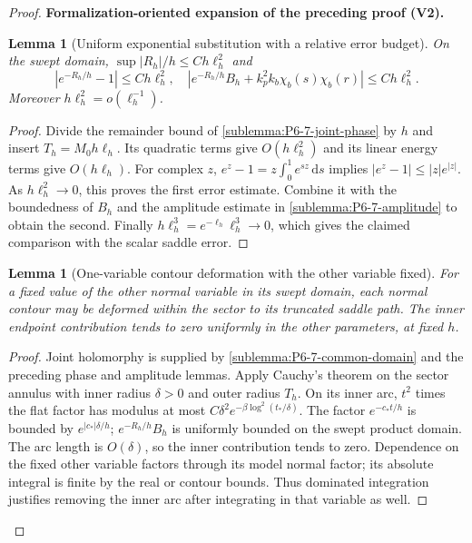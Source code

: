 \documentclass[11pt]{article}
\newtheorem{lemma}[theorem]{Lemma}
\newcommand{\formalisationparentid}{X}
\newenvironment{formalisationaddition}[1]{\par\medskip\begingroup\color{blue}\def\formalisationparentid{#1}\setcounter{formalizationsublemma}{0}\let\lemma\formalizationsublemma\let\endlemma\endformalizationsublemma
  \def\Eo{\mathcal E_h^\circ}\def\EE{\mathcal E_h}\def\phio{\phi_h^\circ}\def\phih{\phi_h}\def\Ho{H_h^{\rm atom}(v^\circ)}\def\Ha{H_h^{\rm atom}}\def\HL{H_h^{L}}\def\Dh{D_h}\def\Log{\operatorname{Log}}\def\ellh{\ell_h}\def\Gp{G_{p,h}}\def\Ast{A_{*,h}}\def\ahat{\widehat{\mathfrak a}_h}\def\ah{\mathfrak a_h}\def\rh{\widehat\rho_h}\def\deltah{\widehat\delta_h}\def\oldref##1{\textup{(##1)}}\def\interface##1{\par\noindent\textit{Analytical interface used here.} ##1\par}\def\finish{\par\noindent\textit{Conclusion of the formalization-oriented expansion.} }\par\noindent\textbf{Formalization-oriented expansion of the preceding proof (V2).}\par\smallskip
}{\par\endgroup\medskip
}
\begin{document}
\begin{proof}
\begin{formalisationaddition}{P6.7}
\begin{lemma}[Uniform exponential substitution with a relative error budget]\label{sublemma:P6-7-exponential-budget}
On the swept domain,
$\sup|R_h|/h\le Ch\ell_h^2$ and
\[
 |e^{-R_h/h}-1|\le Ch\ell_h^2,
 \quad
 |e^{-R_h/h}B_h+k_p^2k_b\chi_b(s)\chi_b(r)|\le Ch\ell_h^2.
\]
Moreover $h\ell_h^2=o(\ell_h^{-1})$.
\end{lemma}
\begin{proof}
Divide the remainder bound of
\ref{sublemma:P6-7-joint-phase} by $h$ and insert
$T_h=M_0h\ell_h$. Its quadratic terms give $O(h\ell_h^2)$ and
its linear energy terms give $O(h\ell_h)$.
For complex $z$, $e^z-1=z\int_0^1e^{sz}\,\mathrm ds$ implies
$|e^z-1|\le |z|e^{|z|}$.
As $h\ell_h^2\to0$, this proves the first error estimate.
Combine it with the boundedness of $B_h$ and the amplitude estimate
in \ref{sublemma:P6-7-amplitude} to obtain the second.
Finally $h\ell_h^3=e^{-\ell_h}\ell_h^3\to0$, which gives the
claimed comparison with the scalar saddle error.
\end{proof}

\begin{lemma}[One-variable contour deformation with the other variable fixed]\label{sublemma:P6-7-one-contour}
For a fixed value of the other normal variable in its swept domain,
each normal contour may be deformed within the sector to its truncated
saddle path. The inner endpoint contribution tends to zero uniformly
in the other parameters, at fixed $h$.
\end{lemma}
\begin{proof}
Joint holomorphy is supplied by
\ref{sublemma:P6-7-common-domain} and the preceding phase and amplitude
lemmas. Apply Cauchy's theorem on the sector annulus with inner radius
$\delta>0$ and outer radius $T_h$.
On its inner arc, $t^2$ times the flat factor has modulus at most
$C\delta^2e^{-\beta\log^2(t_*/\delta)}$.
The factor $e^{-c_*t/h}$ is bounded by $e^{|c_*|\delta/h}$;
$e^{-R_h/h}B_h$ is uniformly bounded on the swept product domain.
The arc length is $O(\delta)$, so the inner contribution tends to
zero. Dependence on the fixed other variable factors through its
model normal factor; its absolute integral is finite by the real or
contour bounds. Thus dominated integration justifies removing the inner
arc after integrating in that variable as well.
\end{proof}


\end{formalisationaddition}
\end{proof}
\end{document}
